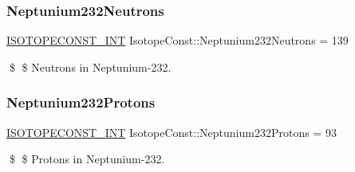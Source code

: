 \subsubsection{\texorpdfstring{Neptunium232\+Neutrons}{Neptunium232Neutrons}}
{\footnotesize\ttfamily \mbox{\hyperlink{group___isotope_const-_macros_ga5f18360b3e99483a35c32d789e62621c}{I\+S\+O\+T\+O\+P\+E\+C\+O\+N\+S\+T\+\_\+\+I\+NT}} Isotope\+Const\+::\+Neptunium232\+Neutrons = 139}

\$ \$ Neutrons in Neptunium-\/232. \mbox{\label{group___isotope_const-_neptunium-_np232_ga7cd1b1843e39e864f90d9309803b918b}} 
\subsubsection{\texorpdfstring{Neptunium232\+Protons}{Neptunium232Protons}}
{\footnotesize\ttfamily \mbox{\hyperlink{group___isotope_const-_macros_ga5f18360b3e99483a35c32d789e62621c}{I\+S\+O\+T\+O\+P\+E\+C\+O\+N\+S\+T\+\_\+\+I\+NT}} Isotope\+Const\+::\+Neptunium232\+Protons = 93}

\$ \$ Protons in Neptunium-\/232. 